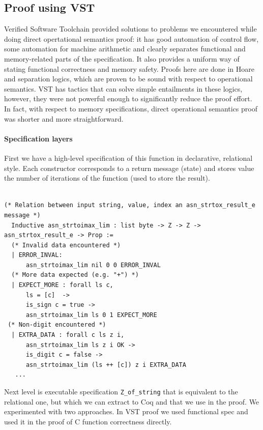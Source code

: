 \documentclass[acmsmall,nonacm]{acmart}
\begin{document}
\subsection{Proof using VST}

Verified Software Toolchain provided solutions to problems we encountered while doing direct opertational semantics proof: it has good automation of control flow, some automation for machine arithmetic and clearly separates functional and memory-related parts of the specification. It also provides a uniform way of stating functional correctness and memory safety. Proofs here are done in Hoare and separation logics, which are proven to be sound with respect to operational semantics. VST has tactics that can solve simple entailments in these logics, however, they were not powerful enough to significantly reduce the proof effort. In fact, with respect to memory specifications, direct operational semantics proof was shorter and more straightforward.

\paragraph{Specification layers} First we have a high-level specification of this function in declarative, relational style. Each constructor corresponds to a return message (state) and stores value the number of iterations of the function (used to store the result).

 \begin{lstlisting}[language=Coq]

(* Relation between input string, value, index an asn_strtox_result_e message *)
  Inductive asn_strtoimax_lim : list byte -> Z -> Z -> asn_strtox_result_e -> Prop :=
  (* Invalid data encountered *)
  | ERROR_INVAL:
      asn_strtoimax_lim nil 0 0 ERROR_INVAL
  (* More data expected (e.g. "+") *)
  | EXPECT_MORE : forall ls c,
      ls = [c]  ->
      is_sign c = true ->
      asn_strtoimax_lim ls 0 1 EXPECT_MORE
 (* Non-digit encountered *)
  | EXTRA_DATA : forall c ls z i,
      asn_strtoimax_lim ls z i OK ->
      is_digit c = false -> 
      asn_strtoimax_lim (ls ++ [c]) z i EXTRA_DATA
   ...    
  \end{lstlisting}

Next level is executable specification \texttt{Z\_of\_string} that is equivalent to the relational one, but which we can extract to Coq and that we use in the proof. We experimented with two approaches. In VST proof we used functional spec and used it in the proof of C function correctness directly.
\end{document}

